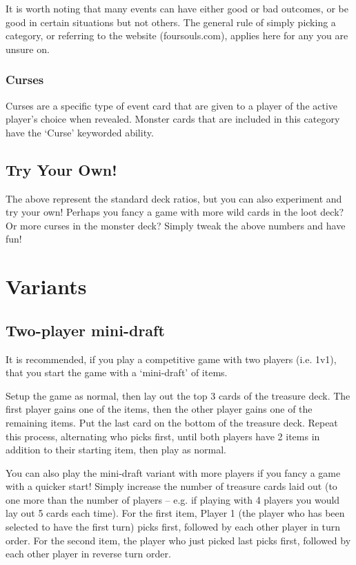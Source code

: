 \documentclass[a4paper, twoside]{report} %
\begin{document}
    It is worth noting that many events can have either good or bad outcomes, or be good in certain situations but not others. The general rule of simply picking a category, or referring to the website (foursouls.com), applies here for any you are unsure on.
    \subsection*{Curses}
    Curses are a specific type of event card that are given to a player of the active player’s choice when revealed. Monster cards that are included in this category have the ‘Curse’ keyworded ability.
    \section{Try Your Own!}
    The above represent the standard deck ratios, but you can also experiment and try your own! Perhaps you fancy a game with more wild cards in the loot deck? Or more curses in the monster deck? Simply tweak the above numbers and have fun!

    \chapter{Variants}
    \section{Two-player mini-draft}
    It is recommended, if you play a competitive game with two players (i.e. 1v1), that you start the game with a ‘mini-draft’ of items.
    
    Setup the game as normal, then lay out the top 3 cards of the treasure deck. The first player gains one of the items, then the other player gains one of the remaining items. Put the last card on the bottom of the treasure deck. Repeat this process, alternating who picks first, until both players have 2 items in addition to their starting item, then play as normal.
    
    You can also play the mini-draft variant with more players if you fancy a game with a quicker start! Simply increase the number of treasure cards laid out (to one more than the number of players – e.g. if playing with 4 players you would lay out 5 cards each time). For the first item, Player 1 (the player who has been selected to have the first turn) picks first, followed by each other player in turn order. For the second item, the player who just picked last picks first, followed by each other player in reverse turn order.
\end{document}
